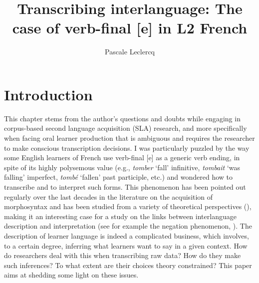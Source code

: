 \documentclass[output=paper,colorlinks,citecolor=brown,modfonts,nonflat]{../langscibook}
\author{Pascale Leclercq\affiliation{Université Paul Valéry Montpellier 3}\orcid{}}
\title{Transcribing interlanguage: The case of verb-final [e] in L2 French}
\begin{document}
\maketitle 
{}


\section{Introduction}

This chapter stems from the author’s questions and doubts while engaging in corpus-based second language acquisition (SLA) research, and more specifically when facing oral learner production that is ambiguous and requires the researcher to make conscious transcription decisions. I was particularly puzzled by the way some English learners of French use verb-final [e] as a generic verb ending, in spite of its highly polysemous value (e.g., \textit{tomber} ‘fall’ infinitive, \textit{tombait} ‘was falling’ imperfect, \textit{tombé} ‘fallen’ past participle, etc.) and wondered how to transcribe and to interpret such forms. This phenomenon has been pointed out regularly over the last decades in the literature on the acquisition of morphosyntax and has been studied from a variety of theoretical perspectives (\citealt{MylesEtAl1998,Herschensohn2001,BartningSchlyter2004}), making it an interesting case for a study on the links between interlanguage description and interpretation (see for example the negation phenomenon, \citealt{Ortega2014trying}). The description of learner language is indeed a complicated business, which involves, to a certain degree, inferring what learners want to say in a given context. How do researchers deal with this when transcribing raw data? How do they make such inferences? To what extent are their choices theory constrained? This paper aims at shedding some light on these issues.
\end{document}
